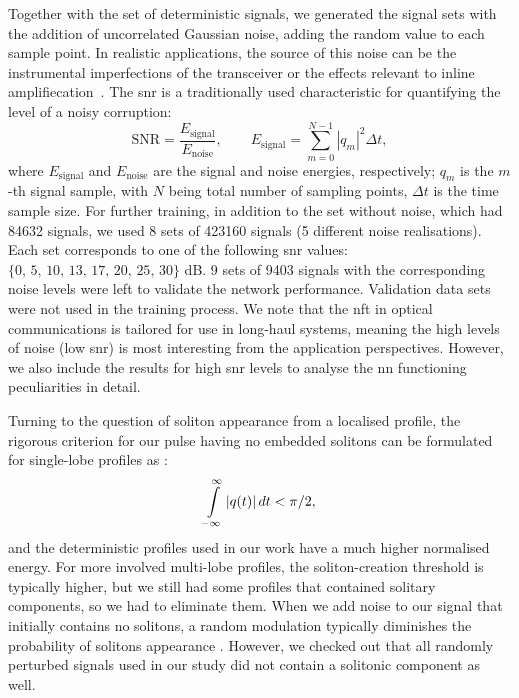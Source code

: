 Together with the set of deterministic signals, we generated the signal sets with the addition of uncorrelated Gaussian noise, adding the random value to each sample point. In realistic applications, the source of this noise can be the instrumental imperfections of the transceiver or the effects relevant to inline amplifiecation~\cite{a12}. The \acrfull{snr} is a traditionally used characteristic for quantifying  the level of a noisy corruption: 
\begin{equation}
    \text{SNR} = \frac{E_{\text{signal}}}{E_{\text{noise}}} {,} \qquad
    E_{\text{signal}} = \sum_{m = 0}^{N - 1} |q_m|^2 \Delta t {,}
    \label{eq:snr}
\end{equation}
where $E_{\text{signal}}$ and $E_{\text{noise}}$ are the signal and noise energies, respectively; $q_m$ is the $m$-th signal sample, with $N$ being total number of sampling points, $\Delta t$ is the time sample size. For further training, in addition to the set without noise, which had 84632 signals, we used 8 sets of 423160 signals (5 different noise realisations). Each set corresponds to one of the following \acrshort{snr} values: $\{0, \, 5, \,10, \, 13, \, 17, \, 20, \, 25, \, 30\}$ dB. 
9 sets of 9403 signals with the corresponding noise levels were left to validate the network performance. Validation data sets were not used in the training process. 
We note that the \acrshort{nft} in optical communications is tailored for use in long-haul systems, meaning the high levels of noise (low \acrshort{snr}) is most interesting from the application perspectives. However, we also include the results for high \acrshort{snr} levels to analyse the \acrshort{nn} functioning peculiarities in detail.


Turning to the question of soliton appearance from a localised profile, the rigorous criterion for our pulse having no embedded solitons can be formulated for single-lobe profiles as \cite{ks03}:
\begin{equation}\label{l1}
\intop_{-\infty}^{\infty} |q(t)| \, dt < \pi/2,
\end{equation}
and the deterministic profiles used in our work have a much higher normalised energy. For more involved multi-lobe profiles, the soliton-creation threshold is typically higher, but we still had some profiles that contained solitary components, so we had to eliminate them. When we add noise to our signal that initially contains no solitons, a random modulation typically diminishes the probability of solitons appearance \cite{td08,dp08}. However, we checked out that all randomly perturbed signals used in our study did not contain a solitonic component as well.


